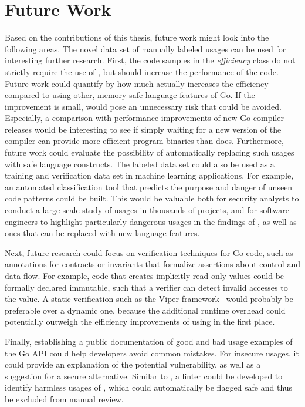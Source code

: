 
\chapter{Future Work}\label{ch:future-work}

Based on the contributions of this thesis, future work might look into the following areas.
The novel data set of manually labeled \unsafe{} usages can be used for interesting further research.
First, the code samples in the \textit{efficiency} class do not strictly require the use of \unsafe{}, but should
increase the performance of the code.
Future work could quantify by how much \unsafe{} actually increases the efficiency compared to using other, memory-safe
language features of Go.
If the improvement is small, \unsafe{} would pose an unnecessary risk that could be avoided.
Especially, a comparison with performance improvements of new Go compiler releases would be interesting to see if
simply waiting for a new version of the compiler can provide more efficient program binaries than \unsafe{} does.
Furthermore, future work could evaluate the possibility of automatically replacing such \unsafe{} usages with safe
language constructs.
The labeled data set could also be used as a training and verification data set in machine learning applications.
For example, an automated classification tool that predicts the purpose and danger of unseen \unsafe{} code patterns
could be built.
This would be valuable both for security analysts to conduct a large-scale study of \unsafe{} usages in thousands of
projects, and for software engineers to highlight particularly dangerous usages in the findings of \toolGeiger{}, as
well as ones that can be replaced with new language features.

Next, future research could focus on verification techniques for \unsafe{} Go code, such as annotations for
contracts or invariants that formalize assertions about control and data flow.
For example, \unsafe{} code that creates implicitly read-only values could be formally declared immutable, such that
a verifier can detect invalid accesses to the value.
A static verification such as the Viper framework~\cite{muller2016} would probably be preferable over a dynamic one,
because the additional runtime overhead could potentially outweigh the efficiency improvements of using \unsafe{} in the
first place.

Finally, establishing a public documentation of good and bad usage examples of the Go \unsafe{} \acrshort{API} could
help developers avoid common mistakes.
For insecure usages, it could provide an explanation of the potential vulnerability, as well as a suggestion for a
secure alternative.
Similar to \toolSafer{}, a linter could be developed to identify harmless usages of \unsafe{}, which could automatically
be flagged safe and thus be excluded from manual review.

